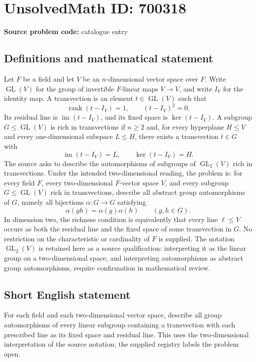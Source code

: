 \documentclass[11pt]{article}
\begin{document}
\section*{UnsolvedMath ID: 700318}
\textbf{Source problem code:} catalogue entry
\subsection{Definitions and mathematical statement}
Let \(F\) be a field and let \(V\) be an \(n\)-dimensional vector space over \(F\). Write \(\operatorname{GL}(V)\) for the group of invertible \(F\)-linear maps \(V\to V\), and write \(I_V\) for the identity map. A transvection is an element \(t\in\operatorname{GL}(V)\) such that
\[
\operatorname{rank}(t-I_V)=1,\qquad (t-I_V)^2=0.
\]
Its residual line is \(\operatorname{im}(t-I_V)\), and its fixed space is \(\ker(t-I_V)\). A subgroup \(G\leq\operatorname{GL}(V)\) is rich in transvections if \(n\geq2\) and, for every hyperplane \(H\leq V\) and every one-dimensional subspace \(L\leq H\), there exists a transvection \(t\in G\) with
\[
\operatorname{im}(t-I_V)=L,\qquad \ker(t-I_V)=H.
\]
The source asks to describe the automorphisms of subgroups of \(\operatorname{GL}_2(V)\) rich in transvections. Under the intended two-dimensional reading, the problem is: for every field \(F\), every two-dimensional \(F\)-vector space \(V\), and every subgroup \(G\leq\operatorname{GL}(V)\) rich in transvections, describe all abstract group automorphisms of \(G\), namely all bijections \(\alpha:G\to G\) satisfying
\[
\alpha(gh)=\alpha(g)\alpha(h)\qquad(g,h\in G).
\]
In dimension two, the richness condition is equivalently that every line \(\ell\leq V\) occurs as both the residual line and the fixed space of some transvection in \(G\). No restriction on the characteristic or cardinality of \(F\) is supplied. The notation \(\operatorname{GL}_2(V)\) is retained here as a source qualification: interpreting it as the linear group on a two-dimensional space, and interpreting automorphisms as abstract group automorphisms, require confirmation in mathematical review.
\subsection{Short English statement}
For each field and each two-dimensional vector space, describe all group automorphisms of every linear subgroup containing a transvection with each prescribed line as its fixed space and residual line. This uses the two-dimensional interpretation of the source notation; the supplied registry labels the problem open.
\end{document}
